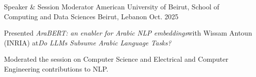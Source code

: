 

\begin{cventries}

  \cventry
    {Speaker \& Session Moderator} %
    {American University of Beirut, School of Computing and Data Sciences} %
    {Beirut, Lebanon} %
    {Oct. 2025} %
    {
      \begin{cvitems} %
        \item {Presented \textit{AraBERT: an enabler for Arabic NLP embeddings}\atsspace with Wissam Antoun (INRIA) at\atsspace \textit{Do LLMs Subsume Arabic Language Tasks?}}
        \item {Moderated the session on Computer Science and Electrical and Computer Engineering contributions to NLP.}
      \end{cvitems}
    }



\end{cventries}

